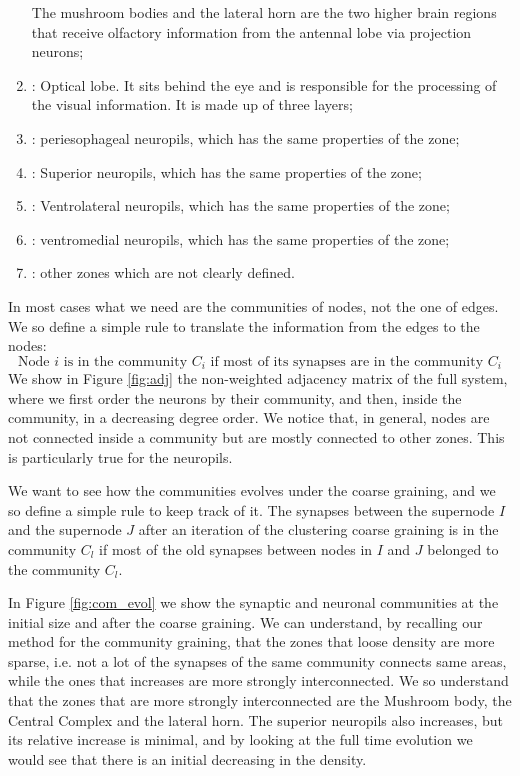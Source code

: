 \begin{enumerate}
         The mushroom bodies and the lateral horn are the two higher brain regions that receive 
         olfactory information from the antennal lobe via projection neurons;
    \item {}: Optical lobe. It sits behind the eye and is responsible for the processing
         of the visual information. It is made up of three layers;
    \item {}: periesophageal neuropils, which has the same properties 
        of the  zone;
    \item {}: Superior neuropils, which has the same properties 
        of the  zone;
    \item {}: Ventrolateral neuropils, which has the same properties 
        of the  zone;
    \item {}: ventromedial neuropils, which has the same properties 
        of the  zone;
    \item {}: other zones which are not clearly defined.
\end{enumerate}

In most cases what we need are the communities of nodes, not the one of edges. We so define a 
simple rule to translate the information from the edges to the nodes: 
$$
\mbox{Node $i$ is in the community $C_i$ if most of its synapses are in the community $C_i$}
$$
We show in Figure \ref{fig:adj} the non-weighted adjacency matrix of the full system, where we
first order the neurons by their community, and then, inside the community, in a decreasing 
degree order. We notice that, in general, nodes are not connected inside a community but are 
mostly connected to other zones. This is particularly true for the neuropils.

We want to see how the communities evolves under the coarse graining, and we so define a simple rule
to keep track of it. The synapses between the supernode $I$ and the supernode $J$ after an iteration
of the clustering coarse graining is in the community $C_l$ if most of the old synapses between
nodes in $I$ and $J$ belonged to the community $C_l$.

In Figure \ref{fig:com_evol} we show the synaptic and neuronal communities at the initial size and after the
coarse graining. We can understand, by recalling our method for the community graining, that the 
zones that loose density are more sparse, i.e. not a lot of the synapses of the same community connects
same areas, while the ones that increases are more strongly interconnected. We so understand that the zones
that are more strongly interconnected are the Mushroom body, the Central Complex and the lateral horn.
The superior neuropils also increases, but its relative increase is minimal, and by looking at the 
full time evolution we would see that there is an initial decreasing in the density.

